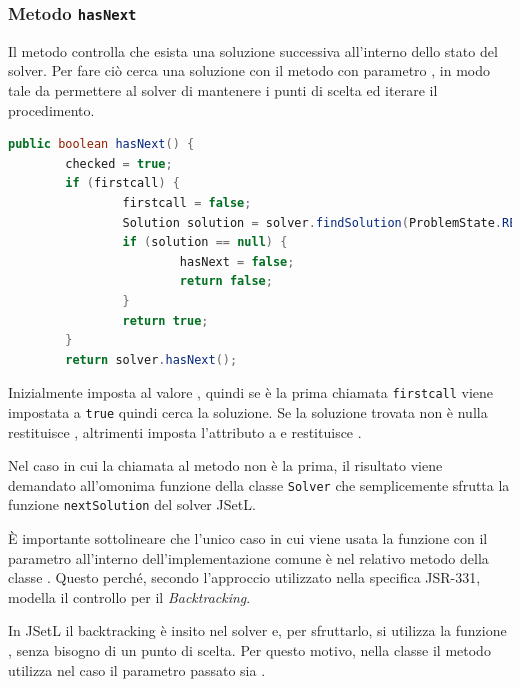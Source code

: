 \subsubsection{Metodo \texttt{hasNext}}
Il metodo  controlla che esista una soluzione successiva
all'interno dello stato del solver. Per fare ciò cerca una soluzione con il
metodo  con parametro , in
modo tale da permettere al solver di mantenere i punti di scelta ed iterare il
procedimento.
\begin{lstlisting}[language = Java,
                   caption = \files{hasNext}.]
public boolean hasNext() {
        checked = true;
        if (firstcall) {
                firstcall = false;
                Solution solution = solver.findSolution(ProblemState.RESTORE);
                if (solution == null) {
                        hasNext = false;
                        return false;
                }
                return true;
        }
        return solver.hasNext();
\end{lstlisting}
Inizialmente imposta  al valore , quindi se è 
la prima chiamata \texttt{firstcall} viene impostata a \texttt{true} quindi
cerca la soluzione.
Se la soluzione trovata non è nulla restituisce , altrimenti
imposta l'attributo  a  e restituisce
.

Nel caso in cui la chiamata al metodo non è la prima, il risultato viene
demandato all'omonima funzione della classe \texttt{Solver} che semplicemente
sfrutta la funzione \texttt{nextSolution} del solver JSetL.


\begin{notabene}
\`E importante sottolineare che l'unico caso in cui viene usata la funzione
 con il parametro 
all'interno dell'implementazione comune è nel relativo metodo 
della classe .
Questo perché, secondo l'approccio utilizzato nella specifica JSR-331, 
 modella il controllo per il \emph{Backtracking}.

In JSetL il backtracking è insito nel solver e, per sfruttarlo, si utilizza la 
funzione
, senza bisogno di un punto di
scelta. Per questo motivo, nella classe  il metodo
 utilizza  nel
caso il parametro passato sia .
\end{notabene}


